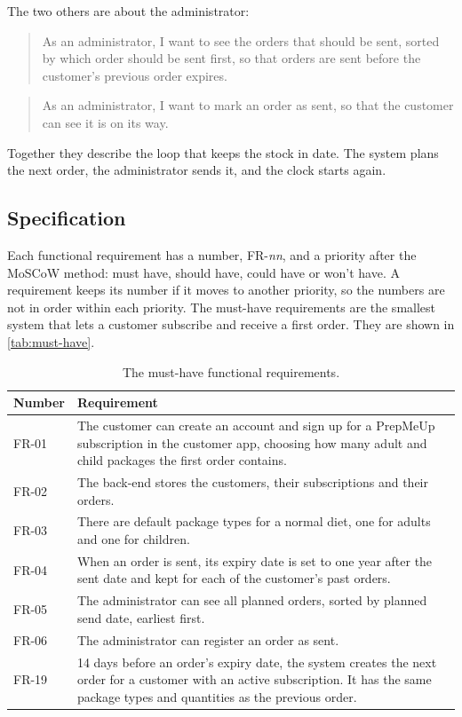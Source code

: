 The two others are about the administrator:

\begin{quote}
As an administrator, I want to see the orders that should be sent, sorted by which order
should be sent first, so that orders are sent before the customer's previous order
expires.
\end{quote}

\begin{quote}
As an administrator, I want to mark an order as sent, so that the customer can see it is
on its way.
\end{quote}

Together they describe the loop that keeps the stock in date. The system plans the next
order, the administrator sends it, and the clock starts again.

\subsection{Specification}\label{sec:req-fr-specification}

Each functional requirement has a number, FR-\emph{nn}, and a priority after the
MoSCoW method: must have, should have, could have or won't have. A requirement keeps
its number if it moves to another priority, so the numbers are not in order within
each priority. The must-have requirements are the smallest system that lets a customer
subscribe and receive a first order. They are shown in \autoref{tab:must-have}.

\begin{table}[H]
    \centering
    \begin{tabular}{@{}p{1.6cm} p{12.6cm}@{}}
        \hline
        Number & Requirement \\
        \hline
        FR-01 & The customer can create an account and sign up for a PrepMeUp subscription in the customer app, choosing how many adult and child packages the first order contains. \\
        FR-02 & The back-end stores the customers, their subscriptions and their orders. \\
        FR-03 & There are default package types for a normal diet, one for adults and one for children. \\
        FR-04 & When an order is sent, its expiry date is set to one year after the sent date and kept for each of the customer's past orders. \\
        FR-05 & The administrator can see all planned orders, sorted by planned send date, earliest first. \\
        FR-06 & The administrator can register an order as sent. \\
        FR-19 & 14 days before an order's expiry date, the system creates the next order for a customer with an active subscription. It has the same package types and quantities as the previous order. \\
        \hline
    \end{tabular}
    \caption{The must-have functional requirements.}
    \label{tab:must-have}
\end{table}

